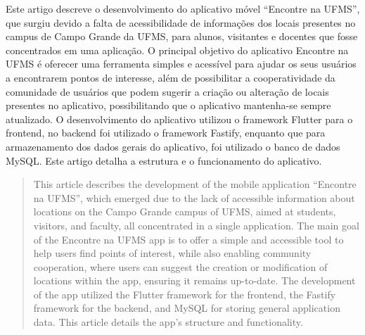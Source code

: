   \begin{resumo} 
    Este artigo descreve o desenvolvimento do aplicativo móvel ``Encontre na UFMS'', que surgiu devido a falta de acessibilidade de informações dos locais presentes no campus de Campo Grande da UFMS, para alunos, visitantes e docentes que fosse concentrados em uma aplicação. O principal objetivo do aplicativo Encontre na UFMS é oferecer uma ferramenta simples e acessível para ajudar os seus usuários a encontrarem pontos de interesse, além de possibilitar a cooperatividade da comunidade de usuários que podem sugerir a criação ou alteração de locais presentes no aplicativo, possibilitando que o aplicativo mantenha-se sempre atualizado. O desenvolvimento do aplicativo utilizou o framework Flutter para o frontend, no backend foi utilizado o framework Fastify, enquanto que para armazenamento dos dados gerais do aplicativo, foi utilizado o banco de dados MySQL. Este artigo detalha a estrutura e o funcionamento do aplicativo.
  \end{resumo}
  
  \begin{abstract}
    This article describes the development of the mobile application ``Encontre na UFMS'', which emerged due to the lack of accessible information about locations on the Campo Grande campus of UFMS, aimed at students, visitors, and faculty, all concentrated in a single application. The main goal of the Encontre na UFMS app is to offer a simple and accessible tool to help users find points of interest, while also enabling community cooperation, where users can suggest the creation or modification of locations within the app, ensuring it remains up-to-date. The development of the app utilized the Flutter framework for the frontend, the Fastify framework for the backend, and MySQL for storing general application data. This article details the app's structure and functionality.
  \end{abstract}